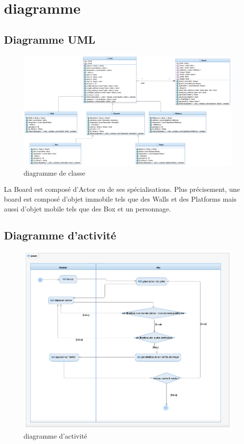 \newpage
\section{diagramme}
\subsection{Diagramme UML}
\begin{figure}[h]
	\centering
	\includegraphics[width=\textwidth] {pictures/uml.png}
	\caption{diagramme de classe}
	\label{fig:UML}
\end{figure}
La Board est composé d'Actor ou de ses spécialisations. Plus précisement, une board est composé d'objet immobile tels que des Walls et des Platforms mais aussi d'objet mobile tels que des Box et un personnage.

\newpage
\subsection{Diagramme d'activité}
\begin{figure}[h]
	\centering
	\includegraphics[width=\textwidth] {pictures/dia_activite_jouer.png}
	\caption{diagramme d'activité}
	\label{fig:diagramme_activite}
\end{figure}

